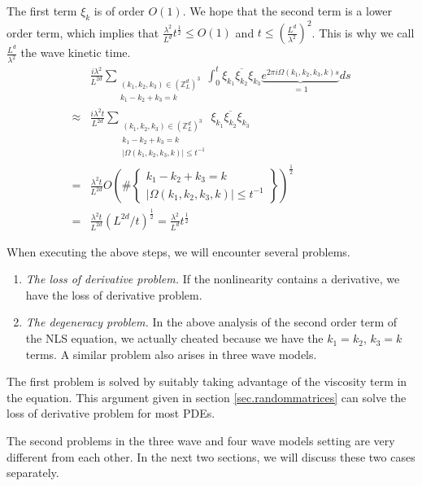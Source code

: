 The first term $\xi_k$ is of order $O(1)$. We hope that the second term is a lower order term, which implies that $\frac{\lambda^2}{L^{d}} t^{\frac{1}{2}}\le O(1)$ and $t\le \left(\frac{L^{d}}{\lambda^2} \right)^2$. This is why we call $\frac{L^{d}}{\lambda^2}$ the wave kinetic time.
\begin{equation}
    \begin{split}
        & \frac{i\lambda^2}{L^{2d}} \sum\limits_{\substack{(k_1,k_2,k_3) \in (\mathbb{Z}^d_L)^3 \\ k_1 - k_2 + k_3 = k}}\int_{0}^{t} \xi_{k_1} \overline{\xi_{k_2}} \xi_{k_3}\underbrace{e^{2\pi i \Omega(k_1,k_2,k_3,k)s}}_{=1} ds 
        \\
        \approx & \frac{i\lambda^2t}{L^{2d}} \sum\limits_{\substack{(k_1,k_2,k_3) \in (\mathbb{Z}^d_L)^3 \\ k_1 - k_2 + k_3 = k\\ |\Omega(k_1,k_2,k_3,k)|\le t^{-1}}} \xi_{k_1} \overline{\xi_{k_2}} \xi_{k_3}
        \\
        = & \frac{\lambda^2t}{L^{2d}}O\left(\#\left\{\begin{array}{cc}
             k_1 - k_2 + k_3 = k  \\
             |\Omega(k_1,k_2,k_3,k)|\le t^{-1}
        \end{array}\right\}\right)^{\frac{1}{2}}
        \\
        =& \frac{\lambda^2t}{L^{2d}} (L^{2d}/t)^{\frac{1}{2}} = \frac{\lambda^2}{L^{d}} t^{\frac{1}{2}}
    \end{split}
\end{equation}

When executing the above steps, we will encounter several problems.

\begin{enumerate}
    \item \textit{The loss of derivative problem.} If the nonlinearity contains a derivative, we have the loss of derivative problem.
    \item \textit{The degeneracy problem.} In the above analysis of the second order term of the NLS equation, we actually cheated because we have the $k_1=k_2$, $k_3=k$ terms. A similar problem also arises in three wave models.
\end{enumerate}

The first problem is solved by suitably taking advantage of the viscosity term in the equation. This argument given in section \ref{sec.randommatrices} can solve the loss of derivative problem for most PDEs.

The second problems in the three wave and four wave models setting are very different from each other. In the next two sections, we will discuss these two cases separately.